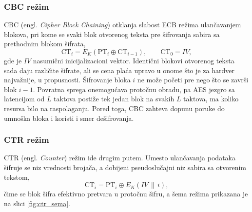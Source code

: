 \subsubsection{CBC režim}

CBC (engl. \textit{Cipher Block Chaining}) otklanja slabost ECB režima ulančavanjem blokova, pri kome se svaki blok otvorenog teksta pre šifrovanja sabira sa prethodnim blokom šifrata,
\begin{equation}
    \mathrm{CT}_i = E_K(\mathrm{PT}_i \oplus \mathrm{CT}_{i-1}), \qquad \mathrm{CT}_0 = IV,
\end{equation}
gde je $IV$ nasumični inicijalizacioni vektor. Identični blokovi otvorenog teksta sada daju različite šifrate, ali se cena plaća upravo u onome što je za hardver najvažnije, u propusnosti. Šifrovanje bloka $i$ ne može početi pre nego što se završi blok $i-1$. Povratna sprega onemogućava protočnu obradu, pa AES jezgro sa latencijom od $L$ taktova postiže tek jedan blok na svakih $L$ taktova, ma koliko resursa bilo na raspolaganju. Pored toga, CBC zahteva dopunu poruke do umnoška bloka i koristi i smer dešifrovanja.

\subsubsection{CTR režim}
\label{subsubsec:ctr_rezim}

CTR (engl. \textit{Counter}) režim ide drugim putem. Umesto ulančavanja podataka šifruje se niz vrednosti brojača, a dobijeni pseudoslučajni niz sabira sa otvorenim tekstom,
\begin{equation}
    \mathrm{CT}_i = \mathrm{PT}_i \oplus E_K(IV \,\|\, i),
    \label{eq:ctr_generic}
\end{equation}
čime se blok šifra efektivno pretvara u protočnu šifru, a šema režima prikazana je na slici \ref{fig:ctr_sema}.

